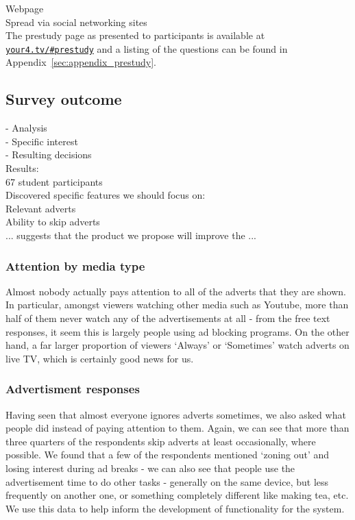 Webpage\\
Spread via social networking sites\\


The prestudy page as presented to participants is available at \href{http://your4.tv/\#prestudy}{\texttt{your4.tv/\textit{\#}prestudy}} and a listing of the questions can be found in Appendix~\ref{sec:appendix_prestudy}. %


\subsection{Survey outcome}



 - Analysis\\
  - Specific interest\\
  - Resulting decisions\\

Results:\\
67 student participants\\
Discovered specific features we should focus on:\\
Relevant adverts\\
Ability to skip adverts\\
... suggests that the product we propose will improve the ...

\subsubsection{Attention by media type}
Almost nobody actually pays attention to all of the adverts that they are shown. In particular, amongst viewers watching other media such as Youtube, more than half of them never watch any of the advertisements at all - from the free text responses, it seem this is largely people using ad blocking programs. On the other hand, a far larger proportion of viewers `Always' or `Sometimes' watch adverts on live TV, which is certainly good news for us.

\subsubsection{Advertisment responses}
Having seen that almost everyone ignores adverts sometimes, we also asked what people did instead of paying attention to them. Again, we can see that more than three quarters of the respondents skip adverts at least occasionally, where possible. We found that a few of the respondents mentioned `zoning out' and losing interest during ad breaks - we can also see that people use the advertisement time to do other tasks - generally on the same device, but less frequently on another one, or something completely different like making tea, etc. We use this data to help inform the development of functionality for the system.

